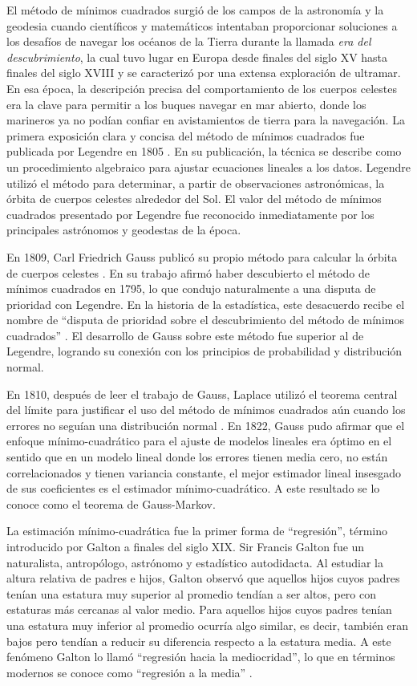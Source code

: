 \documentclass[a4paper,12pt]{report}
\begin{document}
El método de mínimos cuadrados surgió de los campos de la astronomía y la geodesia cuando científicos y matemáticos intentaban proporcionar soluciones a los desafíos de navegar los océanos de la Tierra durante la llamada \textit{era del descubrimiento}, la cual tuvo lugar en Europa desde finales del siglo XV hasta finales del siglo XVIII y se caracterizó por una extensa exploración de ultramar. En esa época, la descripción precisa del comportamiento de los cuerpos celestes era la clave para permitir a los buques navegar en mar abierto, donde los marineros ya no podían confiar en avistamientos de tierra para la navegación. La primera exposición clara y concisa del método de mínimos cuadrados fue publicada por Legendre en 1805 \citep{legendre1805nouvelles}. En su publicación, la técnica se describe como un procedimiento algebraico para ajustar ecuaciones lineales a los datos. Legendre utilizó el método para determinar, a partir de observaciones astronómicas, la órbita de cuerpos celestes alrededor del Sol. El valor del método de mínimos cuadrados presentado por Legendre fue reconocido inmediatamente por los principales astrónomos y geodestas de la época.

En 1809, Carl Friedrich Gauss publicó su propio método para calcular la órbita de cuerpos celestes \citep{gauss1809theoria}. En su trabajo afirmó haber descubierto el método de mínimos cuadrados en 1795, lo que condujo naturalmente a una disputa de prioridad con Legendre. En la historia de la estadística, este desacuerdo recibe el nombre de “disputa de prioridad sobre el descubrimiento del método de mínimos cuadrados” \citep{stigler1981gauss}. El desarrollo de Gauss sobre este método fue superior al de Legendre, logrando su conexión con los principios de probabilidad y distribución normal.

En 1810, después de leer el trabajo de Gauss, Laplace utilizó el teorema central del límite para justificar el uso del método de mínimos cuadrados aún cuando los errores no seguían una distribución normal \citep{marquis1810memoire}. En 1822, Gauss pudo afirmar que el enfoque mínimo-cuadrático para el ajuste de modelos lineales era óptimo en el sentido que en un modelo lineal donde los errores tienen media cero, no están correlacionados y tienen variancia constante, el mejor estimador lineal insesgado de sus coeficientes es el estimador mínimo-cuadrático. A este resultado se lo conoce como el teorema de Gauss-Markov.

La estimación mínimo-cuadrática fue la primer forma de “regresión”, término introducido por Galton a finales del siglo XIX. Sir Francis Galton fue un naturalista, antropólogo, astrónomo y estadístico autodidacta. Al estudiar la altura relativa de padres e hijos, Galton observó que aquellos hijos cuyos padres tenían una estatura muy superior al promedio tendían a ser altos, pero con estaturas más cercanas al valor medio. Para aquellos hijos cuyos padres tenían una estatura muy inferior al promedio ocurría algo similar, es decir, también eran bajos pero tendían a reducir su diferencia respecto a la estatura media. A este fenómeno Galton lo llamó “regresión hacia la mediocridad”, lo que en términos modernos se conoce como “regresión a la media” \citep{galton1886regression}.
\end{document}
